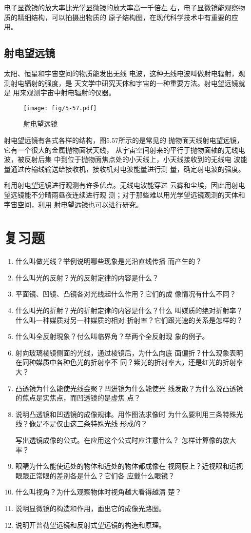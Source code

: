 电子显微镜的放大率比光学显微镜的放大率高一千倍左
右，电子显微镜能观察物质的精细结构，可以拍摄出物质的
原子结构图，在现代科学技术中有重要的应用。

\subsection*{射电望远镜}
太阳、恒星和宇宙空间的物质能发出无线
电波，这种无线电波叫做射电辐射，观测射电辐射的强度，是
天文学中研究天体和宇宙的一种重要方法。射电望远镜就是
用来观测宇宙中射电辐射的仪器。
\begin{figure}[htp]\centering
    \texttt{[image: fig/5-57.pdf]}
    \caption{射电望远镜}
    \end{figure}

射电望远镜有各式各样的结构，图5.57所示的是常见的
抛物面天线射电望远镜，它有一个很大的金属抛物面状天线，
从宇宙空间射来的平行于抛物面轴的无线电波，被反射后集
中到位于抛物面焦点处的小天线上，小天线接收到的无线电
波能量通过传输线输送给接收机，接收机对电波能量进行测
量，确定射电波的强度。

利用射电望远镜进行观测有许多优点。无线电波能穿过
云雾和尘埃，因此用射电望远镜能不分晴雨昼夜连续进行观
测；对于那些难以用光学望远镜观测的天体和字宙空间，利用
射电望远镜也可以进行研究。

\section*{复习题}
\begin{enumerate}
\item 什么叫做光线？举例说明哪些现象是光沿直线传播
而产生的？
\item 什么叫光的反射？光的反射定律的内容是什么？
\item 平面镜、凹镜、凸镜各对光线起什么作用？它们的成
像情况有什么不同？
\item 什么叫光的折射？光的折射定律的内容是什么？什么
叫媒质的绝对折射率？什么叫一种媒质对另一种媒质的相对
折射率？它们跟光速的关系是怎样的？
\item 什么叫全反射現象？付么叫临界角？举两个全反射现
象的例子。
\item 射向玻璃棱镜侧面的光线，通过棱镜后，为什么向底
面偏折？什么现象表明在同种媒质中各种色光的折射率不
同？紫光的折射率大，还是红光的折射率大？
\item 凸透镜为什么能使光线会聚？凹迸镜为什么能使光
线发散？为什么说凸透镜的焦点是实焦点，而凹透镜的是虚焦
点？
\item 说明凸透镜和凹透镜的成像规律。用作图法求像时
为什么要利用三条特殊光线？像是不是仅由这三条特殊光线
形成的？

写出透镜成像的公式。在应用这个公式时应注意什么？
怎样计算像的放大率？
\item 眼睛为什么能使远处的物体和近处的物体都成像在
视网膜上？近视眼和远视眼跟正常眼的差别各是什么？它们各
应戴什么眼镜？
\item 什么叫视角？为什么观察物体时视角越大看得越清
楚？
\item 说明显微镜的构造和作用，画出它的成像光路图。
\item 说明开普勒望远镜和反射式望远镜的构造和原理。

\end{enumerate}


